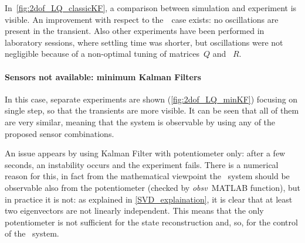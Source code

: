 In~\cref{fig:2dof_LQ_classicKF}, a comparison between simulation and experiment is visible. An improvement with respect to the~\onedof\ case exists: no oscillations are present in the transient. Also other experiments have been performed in laboratory sessions, where settling time was shorter, but oscillations were not negligible because of a non-optimal tuning of matrices~$Q$ and ~$R$.

\paragraph{Sensors not available: minimum Kalman Filters}

In this case, separate experiments are shown (\cref{fig:2dof_LQ_minKF}) focusing on single step, so that the transients are more visible. It can be seen that all of them are very similar, meaning that the system is observable by using any of the proposed sensor combinations.

An issue appears by using Kalman Filter with potentiometer only: after a few seconds, an instability occurs and the experiment fails. There is a numerical reason for this, in fact from the mathematical viewpoint the \twodof~system should be observable also from the potentiometer (checked by \textit{obsv}~MATLAB function), but in practice it is not: as explained in \cref{SVD_explaination}, it is clear that at least two eigenvectors are not linearly independent.
This means that the only potentiometer is not sufficient for the state reconstruction and, so, for the control of the \twodof~system.

